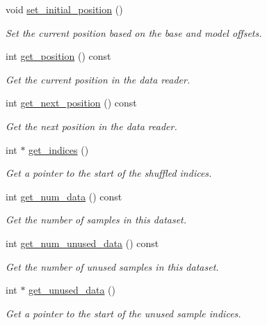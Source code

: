 \begin{DoxyCompactItemize}
void \hyperlink{classlbann_1_1generic__data__reader_ac6d4a5ba1d4e1134620cddcac343bf59}{set\+\_\+initial\+\_\+position} ()
\begin{DoxyCompactList}\small\item\em Set the current position based on the base and model offsets. \end{DoxyCompactList}\item 
int \hyperlink{classlbann_1_1generic__data__reader_aa6e4e7a49d30502a0c60c39720ac2499}{get\+\_\+position} () const
\begin{DoxyCompactList}\small\item\em Get the current position in the data reader. \end{DoxyCompactList}\item 
int \hyperlink{classlbann_1_1generic__data__reader_ab11a9eca77ac9018bdab45ead7ef5e13}{get\+\_\+next\+\_\+position} () const
\begin{DoxyCompactList}\small\item\em Get the next position in the data reader. \end{DoxyCompactList}\item 
int $\ast$ \hyperlink{classlbann_1_1generic__data__reader_ab5c6c70ea1ecf8f7e2ebe2c486e50134}{get\+\_\+indices} ()
\begin{DoxyCompactList}\small\item\em Get a pointer to the start of the shuffled indices. \end{DoxyCompactList}\item 
int \hyperlink{classlbann_1_1generic__data__reader_adcdb833aff7ce85b0879334b252f357a}{get\+\_\+num\+\_\+data} () const
\begin{DoxyCompactList}\small\item\em Get the number of samples in this dataset. \end{DoxyCompactList}\item 
int \hyperlink{classlbann_1_1generic__data__reader_a49d5244c292de9ca489761b940958afd}{get\+\_\+num\+\_\+unused\+\_\+data} () const
\begin{DoxyCompactList}\small\item\em Get the number of unused samples in this dataset. \end{DoxyCompactList}\item 
int $\ast$ \hyperlink{classlbann_1_1generic__data__reader_a94e981ee5b34ce56d1a532fed2ba9e39}{get\+\_\+unused\+\_\+data} ()
\begin{DoxyCompactList}\small\item\em Get a pointer to the start of the unused sample indices. \end{DoxyCompactList}\item 

\end{DoxyCompactItemize}
